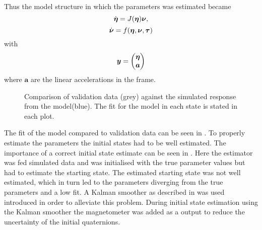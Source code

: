 Thus the model structure in which the parameters was estimated became 
\begin{equation}
\dot{\boldsymbol{\eta}} = J(\boldsymbol{\eta}) \boldsymbol{\nu},
\end{equation}
\begin{equation}
\dot{\boldsymbol{\nu}} =  f(\boldsymbol{\eta}, \boldsymbol{\nu}, \boldsymbol{\tau})
\end{equation}
with 
\begin{equation}
\boldsymbol{y} = \begin{pmatrix}
\boldsymbol{\eta} \\
\boldsymbol{a}
\end{pmatrix}
\end{equation}
where $\boldsymbol{a}$ are the linear accelerations in the \abbrROV frame. 
\begin{figure}[tbp]
  \centering %
  \qquad
  \qquad
    \qquad
    \qquad
    \qquad
  \caption{\label{fig:angVelCompare}%
    Comparison of validation data (grey) against the simulated response from the model(blue). The fit for the model in each state is stated in each plot.}
\end{figure}
The fit of the model compared to validation data can be seen in . To properly estimate the parameters the initial states had to be well estimated. The importance of a correct initial state estimate can be seen in . Here the estimator was fed simulated data and was initialised with the true parameter values but had to estimate the starting state.   The estimated starting state was not well estimated, which in turn led to the parameters diverging from the true parameters and a low fit. A Kalman smoother as described in \citet{Wallin} was used introduced in order to alleviate this problem. During initial state estimation using the Kalman smoother the magnetometer was added as a output to reduce the uncertainty of the initial quaternions.
